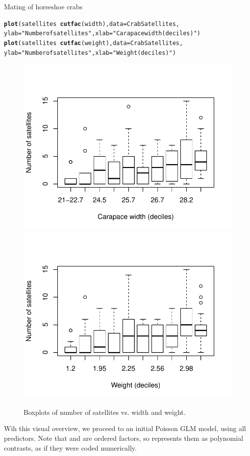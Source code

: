 \documentclass[11pt]{book}\usepackage[]{graphicx}\usepackage[]{color}
\makeatletter
\newcommand{\hlstr}[1]{\textcolor[rgb]{0.192,0.494,0.8}{#1}}%
\newcommand{\hlopt}[1]{\textcolor[rgb]{0,0,0}{#1}}%
\newcommand{\hlstd}[1]{\textcolor[rgb]{0.345,0.345,0.345}{#1}}%
\newcommand{\hlkwc}[1]{\textcolor[rgb]{0.333,0.667,0.333}{#1}}%
\newcommand{\hlkwd}[1]{\textcolor[rgb]{0.737,0.353,0.396}{\textbf{#1}}}%
\newenvironment{kframe}{%
 \def\at@end@of@kframe{}%
 \ifinner\ifhmode%
  \def\at@end@of@kframe{\end{minipage}}%
  \begin{minipage}{\columnwidth}%
 \fi\fi%
 \def\FrameCommand##1{\hskip\@totalleftmargin \hskip-\fboxsep
 \colorbox{shadecolor}{##1}\hskip-\fboxsep
     \hskip-\linewidth \hskip-\@totalleftmargin \hskip\columnwidth}%
 \MakeFramed {\advance\hsize-\width
   \@totalleftmargin\z@ \linewidth\hsize
   \@setminipage}}%
 {\par\unskip\endMakeFramed%
 \at@end@of@kframe}
\newenvironment{knitrout}{}{} %
\renewenvironment{knitrout}{\small\renewcommand{\baselinestretch}{.85}}{} %
\makeatother
\begin{document}
\begin{Example}[crabs1]{Mating of horseshoe crabs}
\begin{knitrout}
\color{fgcolor}\begin{kframe}
\begin{alltt}
\hlkwd{plot}\hlstd{(satellites} \hlopt{~} \hlkwd{cutfac}\hlstd{(width),} \hlkwc{data}\hlstd{=CrabSatellites,}
     \hlkwc{ylab}\hlstd{=}\hlstr{"Number of satellites"}\hlstd{,} \hlkwc{xlab}\hlstd{=}\hlstr{"Carapace width (deciles)"}\hlstd{)}
\hlkwd{plot}\hlstd{(satellites} \hlopt{~} \hlkwd{cutfac}\hlstd{(weight),} \hlkwc{data}\hlstd{=CrabSatellites,}
     \hlkwc{ylab}\hlstd{=}\hlstr{"Number of satellites"}\hlstd{,} \hlkwc{xlab}\hlstd{=}\hlstr{"Weight (deciles)"}\hlstd{)}
\end{alltt}
\end{kframe}\begin{figure}[!htbp]


\centerline{\includegraphics[width=.49\textwidth]{ch09/fig/crabs1-boxplots1} 
\includegraphics[width=.49\textwidth]{ch09/fig/crabs1-boxplots2} }

\caption[Boxplots of number of satellites vs]{Boxplots of number of satellites vs. width and weight.\label{fig:crabs1-boxplots}}
\end{figure}


\end{knitrout}

Wih this visual overview, we proceed to an initial Poisson GLM model, using all predictors.
Note that  and  are ordered factors, so  represents them
as polynomial contrasts, as if they were coded numerically.


\end{Example}
\end{document}
